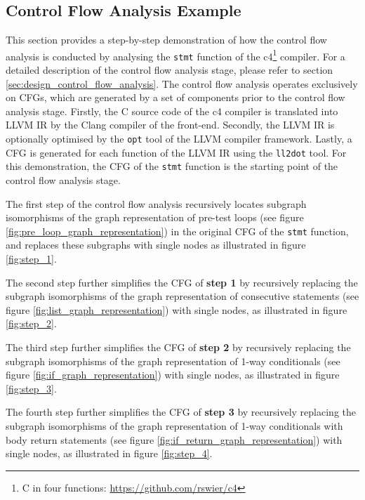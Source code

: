 
\subsection{Control Flow Analysis Example}
\label{app:control_flow_analysis_example}

This section provides a step-by-step demonstration of how the control flow analysis is conducted by analysing the \texttt{stmt} function of the c4\footnote{C in four functions: \url{https://github.com/rswier/c4}} compiler. For a detailed description of the control flow analysis stage, please refer to section \ref{sec:design_control_flow_analysis}. The control flow analysis operates exclusively on CFGs, which are generated by a set of components prior to the control flow analysis stage. Firstly, the C source code of the c4 compiler is translated into LLVM IR by the Clang compiler of the front-end. Secondly, the LLVM IR is optionally optimised by the \texttt{opt} tool of the LLVM compiler framework. Lastly, a CFG is generated for each function of the LLVM IR using the \texttt{ll2dot} tool. For this demonstration, the CFG of the \texttt{stmt} function is the starting point of the control flow analysis stage.

The first step of the control flow analysis recursively locates subgraph isomorphisms of the graph representation of pre-test loops (see figure \ref{fig:pre_loop_graph_representation}) in the original CFG of the \texttt{stmt} function, and replaces these subgraphs with single nodes as illustrated in figure \ref{fig:step_1}.

The second step further simplifies the CFG of \textbf{step 1} by recursively replacing the subgraph isomorphisms of the graph representation of consecutive statements (see figure \ref{fig:list_graph_representation}) with single nodes, as illustrated in figure \ref{fig:step_2}.

The third step further simplifies the CFG of \textbf{step 2} by recursively replacing the subgraph isomorphisms of the graph representation of 1-way conditionals (see figure \ref{fig:if_graph_representation}) with single nodes, as illustrated in figure \ref{fig:step_3}.

The fourth step further simplifies the CFG of \textbf{step 3} by recursively replacing the subgraph isomorphisms of the graph representation of 1-way conditionals with body return statements (see figure \ref{fig:if_return_graph_representation}) with single nodes, as illustrated in figure \ref{fig:step_4}.

